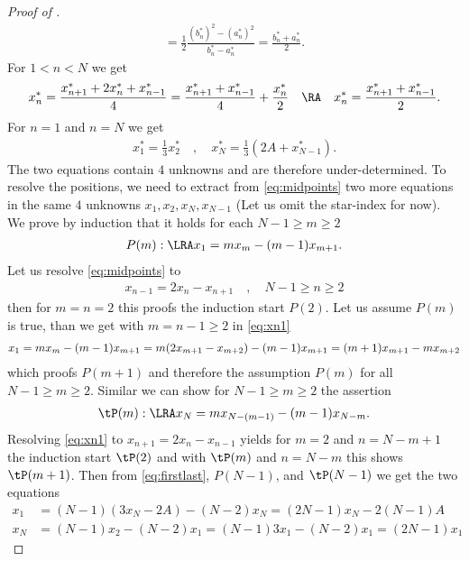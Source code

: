 \begin{proof}[Proof of ]
\begin{align}
      = \frac{1}{2} \frac{(b_n^*)^2-(a_n^*)^2}{b_n^*-a_n^*} = \frac{b_n^*+a_n^*}{2} \label{eq:xniterative}.
  \end{align}
  For $1<n<N$ we get
  \begin{align}
    x_n^*=\frac{x_{n+1}^*+ 2x_n^*+x_{n-1}^*}{4} = \frac{x_{n+1}^*+x_{n-1}^*}{4} +\frac{x_n^*}{2}\quad\RA \quad x_n^*
    =\frac{x_{n+1}^*+x_{n-1}^*}{2}\label{eq:midpoints}.
  \end{align}
  For $n=1$ and $n=N$ we get 
  \begin{align}
      x_1^*=\frac{1}{3}x_2^* \quad,\quad x_N^* = \frac{1}{3}(2A+x^*_{N-1})\label{eq:firstlast}.
  \end{align}
  The two equations contain $4$ unknowns and are therefore under-determined. To resolve the positions, we need to
  extract from \eqref{eq:midpoints} two more equations in the same $4$ unknowns $x_1,x_2,x_N,x_{N-1}$
  (Let us omit the star-index for now).
  We prove by induction that it holds for each $N-1\geq m\geq 2$ 
  \begin{align}
    P(m) :\LRA x_1 = m x_{m} -(m-1) x_{m+1} \label{eq:Pm}.
  \end{align}
  Let us resolve \eqref{eq:midpoints} to 
  \begin{align}
    x_{n-1}=2x_n-x_{n+1} \quad,\quad N-1\geq n\geq 2\label{eq:xn1}
  \end{align}
  then for $m=n=2$ this proofs the induction start $P(2)$. Let us assume $P(m)$ is true, than we get with
  $m=n-1\geq 2$ in \eqref{eq:xn1}  
  \begin{align}
    x_1=mx_m - (m-1)x_{m+1} = m(2x_{m+1} -x_{m+2})-(m-1)x_{m+1}= (m+1)x_{m+1}  -mx_{m+2}\notag
  \end{align}
  which proofs  $P(m+1)$ and therefore the assumption $P(m)$ for all $N-1\geq m\geq 2$.
  Similar we can show for $N-1\geq m\geq 2$ the assertion 
  \begin{align}
    \tP(m):\LRA x_N= mx_{N-(m-1)} - (m-1)x_{N-m}.
  \end{align}
  Resolving \eqref{eq:xn1} to $x_{n+1}=2x_n-x_{n-1}$ yields for $m=2$ and $n=N-m+1$ the
  induction start $\tP(2)$ and with $\tP(m)$ and $n=N-m$ this shows $\tP(m+1)$.  
  Then from \eqref{eq:firstlast}, $P(N-1)$, and $\tP(N-1)$ we get the two equations
  \begin{align}
    x_1 &= (N-1)(3x_{N}-2A)-(N-2)x_{N} = (2N-1)x_{N} -2(N-1)A\\
    x_N &= (N-1)x_{2} -(N-2)x_1=(N-1)3x_1-(N-2)x_1=(2N-1)x_1\label{eq:xN}

\end{align}
\end{proof}
